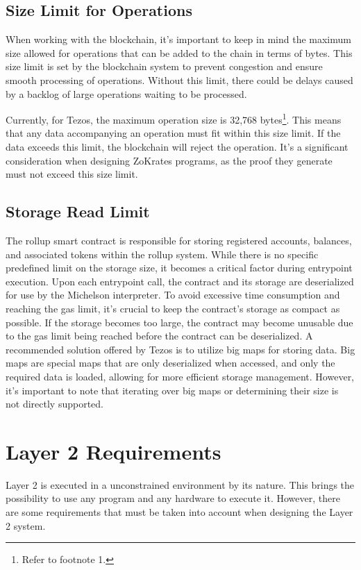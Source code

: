 \subsection{Size Limit for Operations}

When working with the blockchain, it's important to keep in mind the maximum size allowed for operations that can be added to the chain in terms of bytes. This size limit is set by the blockchain system to prevent congestion and ensure smooth processing of operations. Without this limit, there could be delays caused by a backlog of large operations waiting to be processed.

Currently, for Tezos, the maximum operation size is 32,768 bytes\footnote{Refer to footnote 1.}. This means that any data accompanying an operation must fit within this size limit. If the data exceeds this limit, the blockchain will reject the operation. It's a significant consideration when designing ZoKrates programs, as the proof they generate must not exceed this size limit.

\subsection{Storage Read Limit}

The rollup smart contract is responsible for storing registered accounts, balances, and associated tokens within the rollup system. While there is no specific predefined limit on the storage size, it becomes a critical factor during entrypoint execution. Upon each entrypoint call, the contract and its storage are deserialized for use by the Michelson interpreter. To avoid excessive time consumption and reaching the gas limit, it's crucial to keep the contract's storage as compact as possible. If the storage becomes too large, the contract may become unusable due to the gas limit being reached before the contract can be deserialized. A recommended solution offered by Tezos is to utilize big maps for storing data. Big maps are special maps that are only deserialized when accessed, and only the required data is loaded, allowing for more efficient storage management. However, it's important to note that iterating over big maps or determining their size is not directly supported.

\section{Layer 2 Requirements}

Layer 2 is executed in a unconstrained environment by its nature. This brings the possibility to use any program and any hardware to execute it. However, there are some requirements that must be taken into account when designing the Layer 2 system.

